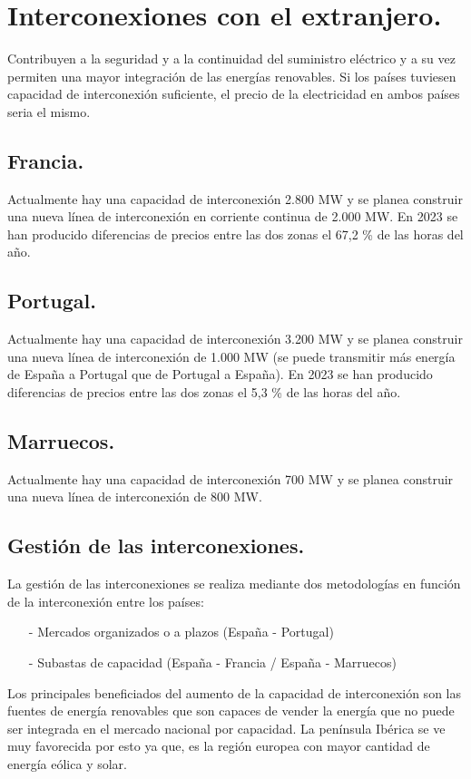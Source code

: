 \section{Interconexiones con el extranjero.}
Contribuyen a la seguridad y a la continuidad del suministro eléctrico y a su vez permiten una
mayor integración de las energías renovables. Si los países tuviesen capacidad de interconexión suficiente, el precio de la electricidad en ambos países seria el mismo.
\subsection{Francia.}
Actualmente hay una capacidad de interconexión 2.800 MW y se planea construir una nueva línea de interconexión en corriente continua de 2.000 MW. En 2023 se han producido diferencias de
precios entre las dos zonas el 67,2 \% de las horas
del año.
\subsection{Portugal.}
Actualmente hay una capacidad de interconexión 3.200 MW   y se planea construir una nueva línea de interconexión de 1.000 MW (se puede transmitir más energía de España a Portugal que de Portugal a España). En 2023 se han producido diferencias de
precios entre las dos zonas el 5,3 \% de las horas
del año.
\subsection{Marruecos.}
Actualmente hay una capacidad de interconexión 700 MW   y se planea construir una nueva línea de interconexión de 800 MW.
\subsection{Gestión de las interconexiones.}
La gestión de las interconexiones se realiza mediante dos metodologías en función de la interconexión entre los países:
\begin{itemize}
	\item [-] Mercados organizados o a plazos (España - Portugal)
	\item [-] Subastas de capacidad (España - Francia / España - Marruecos)
\end{itemize}
Los principales beneficiados del aumento de la capacidad de interconexión son las fuentes de energía renovables que son capaces de vender la energía que no puede ser integrada en el mercado nacional por capacidad. La península Ibérica se ve muy favorecida por esto ya que, es la región europea con mayor cantidad de energía eólica y solar.
\newpage
